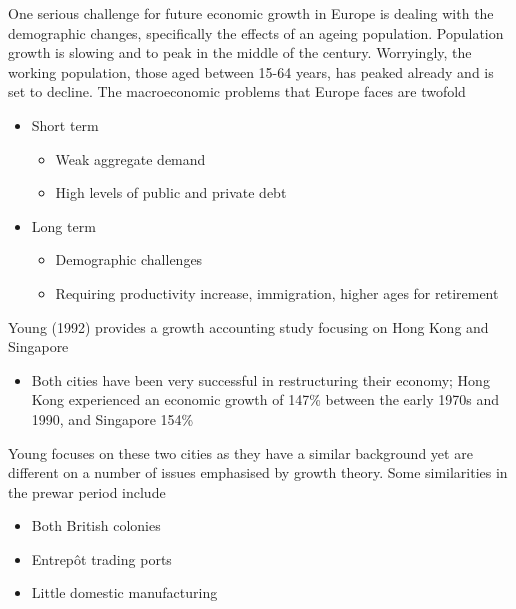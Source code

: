 \documentclass{beamer}
\begin{document}
\begin{frame}
  One serious challenge for future economic growth in Europe is dealing with the demographic changes, specifically the effects of an ageing population.
Population growth is slowing and to peak in the middle of the century.
Worryingly, the working population, those aged between 15-64 years, has peaked already and is set to decline. 
The macroeconomic problems that Europe faces are twofold
\begin{itemize}
  \item Short term
  \begin{itemize}
    \item Weak aggregate demand
    \item High levels of public and private debt
  \end{itemize}
  \item Long term
  \begin{itemize}
    \item Demographic challenges
    \item Requiring productivity increase, immigration, higher ages for retirement
  \end{itemize}
\end{itemize}
\end{frame}

\begin{frame}
 Young (1992) provides a growth accounting study focusing on Hong Kong and Singapore
 \begin{itemize}
   \item Both cities have been very successful in restructuring their economy; Hong Kong experienced an economic growth of 147\% between the early 1970s and 1990, and Singapore 154\%
 \end{itemize}
 \medskip
 Young focuses on these two cities as they have a similar background yet are different on a number of issues emphasised by growth theory. 
  Some similarities in the prewar period include
  \begin{itemize}
    \item Both British colonies
    \item Entrep\^{o}t trading ports
  \item Little domestic manufacturing
  \end{itemize}
\end{frame}
\end{document}
